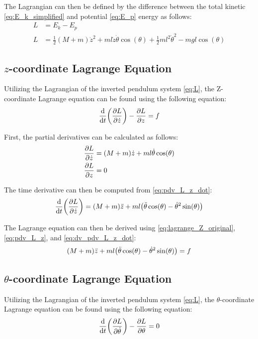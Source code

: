 \documentclass[]{article}
\begin{document}
		The Lagrangian can then be defined by the difference between the total kinetic \eqref{eq:E_k_simplified} and potential \eqref{eq:E_p} energy as follows:
		\begin{align}
			L &= E_k - E_p\\
			L &= \frac{1}{2} (M + m) \dot{z}^2 + m l \dot{z} \dot{\theta}\cos(\theta) + \frac{1}{2} ml^2 \dot{\theta}^2 - m g l \cos(\theta) \label{eq:L}
		\end{align}
	
	\subsection{$z$-coordinate Lagrange Equation}
	
		Utilizing the Lagrangian of the inverted pendulum system \eqref{eq:L}, the Z-coordinate Lagrange equation can be found using the following equation:
		\begin{equation}
			\dv{t} \qty(\pdv{L}{\dot{z}}) - \pdv{L}{z} = f
			\label{eq:lagrange_Z_original}
		\end{equation}
		
		First, the partial derivatives can be calculated as follows:
		\begin{align}
			\pdv{L}{\dot{z}} &= (M+m)\dot{z} + m l \dot{\theta}\cos(\theta) \label{eq:pdv_L_z_dot}\\
			\pdv{L}{z} &= 0 \label{eq:pdv_L_z}
		\end{align}
		
		The time derivative can then be computed from \eqref{eq:pdv_L_z_dot}:
		\begin{equation}
			\dv{t} \qty(\pdv{L}{\dot{z}}) = (M+m)\ddot{z} + m l \qty(\ddot{\theta}\cos(\theta) - \dot{\theta}^2\sin(\theta))
			\label{eq:dv_pdv_L_z_dot}
		\end{equation}
		
		The Lagrange equation can then be derived using \eqref{eq:lagrange_Z_original}, \eqref{eq:pdv_L_z}, and \eqref{eq:dv_pdv_L_z_dot}:
		\begin{equation}
			(M+m)\ddot{z} + m l \qty(\ddot{\theta}\cos(\theta) - \dot{\theta}^2\sin(\theta)) = f
			\label{eq:lagrange_Z}
		\end{equation}
	
	\subsection{$\theta$-coordinate Lagrange Equation}
	
		Utilizing the Lagrangian of the inverted pendulum system \eqref{eq:L}, the $\theta$-coordinate Lagrange equation can be found using the following equation:
		\begin{equation}
			\dv{t} \qty(\pdv{L}{\dot{\theta}}) - \pdv{L}{\theta} = 0
			\label{eq:lagrange_theta_original}
		\end{equation}
		
\end{document}
